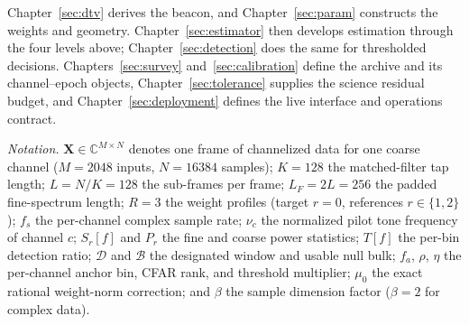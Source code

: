 Chapter~\ref{sec:dtv} derives the beacon, and Chapter~\ref{sec:param} constructs the weights and geometry. Chapter~\ref{sec:estimator} then develops estimation through the four levels above; Chapter~\ref{sec:detection} does the same for thresholded decisions. Chapters~\ref{sec:survey} and~\ref{sec:calibration} define the archive and its channel--epoch objects, Chapter~\ref{sec:tolerance} supplies the science residual budget, and Chapter~\ref{sec:deployment} defines the live interface and operations contract.

\medskip
\noindent\emph{Notation.} $\mathbf{X} \in \mathbb{C}^{M \times N}$ denotes one frame of channelized data for one coarse channel ($M = 2048$ inputs, $N = 16384$ samples); $K = 128$ the matched-filter tap length; $L = N/K = 128$ the sub-frames per frame; $L_F = 2L = 256$ the padded fine-spectrum length; $R = 3$ the weight profiles (target $r = 0$, references $r \in \{1,2\}$); $f_s$ the per-channel complex sample rate; $\nu_c$ the normalized pilot tone frequency of channel $c$; $S_r[f]$ and $P_r$ the fine and coarse power statistics; $T[f]$ the per-bin detection ratio; $\mathcal{D}$ and $\mathcal{B}$ the designated window and usable null bulk; $f_a$, $\rho$, $\eta$ the per-channel anchor bin, CFAR rank, and threshold multiplier; $\mu_0$ the exact rational weight-norm correction; and $\beta$ the sample dimension factor ($\beta = 2$ for complex data).
